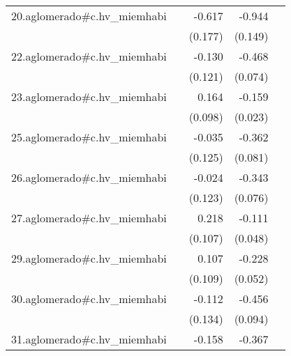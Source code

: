 {\begin{longtable}{l*{4}{D{.}{.}{-1}}}
\addlinespace
20.aglomerado#c.hv\_miemhabi&                     &      -0.617\sym{***}&      -0.944\sym{***}&                     \\
            &                     &     (0.177)         &     (0.149)         &                     \\
\addlinespace
22.aglomerado#c.hv\_miemhabi&                     &      -0.130         &      -0.468\sym{***}&                     \\
            &                     &     (0.121)         &     (0.074)         &                     \\
\addlinespace
23.aglomerado#c.hv\_miemhabi&                     &       0.164         &      -0.159\sym{***}&                     \\
            &                     &     (0.098)         &     (0.023)         &                     \\
\addlinespace
25.aglomerado#c.hv\_miemhabi&                     &      -0.035         &      -0.362\sym{***}&                     \\
            &                     &     (0.125)         &     (0.081)         &                     \\
\addlinespace
26.aglomerado#c.hv\_miemhabi&                     &      -0.024         &      -0.343\sym{***}&                     \\
            &                     &     (0.123)         &     (0.076)         &                     \\
\addlinespace
27.aglomerado#c.hv\_miemhabi&                     &       0.218\sym{*}  &      -0.111\sym{*}  &                     \\
            &                     &     (0.107)         &     (0.048)         &                     \\
\addlinespace
29.aglomerado#c.hv\_miemhabi&                     &       0.107         &      -0.228\sym{***}&                     \\
            &                     &     (0.109)         &     (0.052)         &                     \\
\addlinespace
30.aglomerado#c.hv\_miemhabi&                     &      -0.112         &      -0.456\sym{***}&                     \\
            &                     &     (0.134)         &     (0.094)         &                     \\
\addlinespace
31.aglomerado#c.hv\_miemhabi&                     &      -0.158         &      -0.367\sym{***}&                     \\

\end{longtable}}
